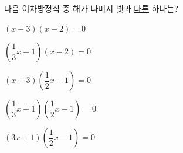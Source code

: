 다음 이차방정식 중 해가 나머지 넷과 \underline{다른} 하나는?
\begin{choicesii}{\rule[-3ex]{0pt}{8ex}$(x+3)(x-2)=0$}{\rule[-3ex]{0pt}{8ex}$\left(\dfrac{1}{3}x+1\right)(x-2)=0$}{\rule[-3ex]{0pt}{8ex}$(x+3)\left(\dfrac{1}{2}x-1\right)=0$}{\rule[-3ex]{0pt}{8ex}$\left(\dfrac{1}{3}x+1\right)\left(\dfrac{1}{2}x-1\right)=0$}{\rule[-3ex]{0pt}{8ex}$(3x+1)\left(\dfrac{1}{2}x-1\right)=0$}\end{choicesii}
